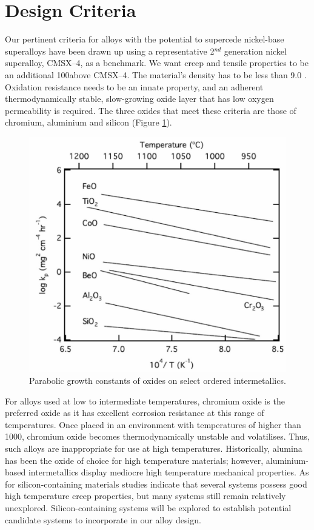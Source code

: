 \section{Design Criteria}

Our pertinent criteria for alloys with the potential to supercede nickel-base superalloys have been drawn up using a representative 2$^{nd}$ generation nickel superalloy, CMSX--4, as a benchmark. We want creep and tensile properties to be an additional 100\celsius above CMSX--4. The material's density has to be less than 9.0 \gram\usk\centi\rpcubic\metre. Oxidation resistance needs to be an innate property, and an adherent thermodynamically stable, slow-growing oxide layer that has low oxygen permeability is required.  The three oxides that meet these criteria are those of chromium, aluminium and silicon (Figure \ref{fig:IntermetallicOxidation}).
%
\begin{figure}[H]
\begin{center}
\includegraphics{IntermetallicOxidation}
\caption{Parabolic growth constants of oxides on select ordered intermetallics.}\label{fig:IntermetallicOxidation}
\end{center}
\end{figure}
%
For alloys used at low to intermediate temperatures, chromium oxide is the preferred oxide as it has excellent corrosion resistance at this range of temperatures. Once placed in an environment with temperatures of higher than 1000\celsius, chromium oxide becomes thermodynamically unstable and volatilises. Thus, such alloys are inappropriate for use at high temperatures. Historically, alumina has been the oxide of choice for high temperature materials; however, aluminium-based intermetallics display mediocre high temperature mechanical properties. As for silicon-containing materials studies indicate that several systems possess good high temperature creep properties, but many systems still remain relatively unexplored. Silicon-containing systems will be explored to establish potential candidate systems to incorporate in our alloy design. 	

